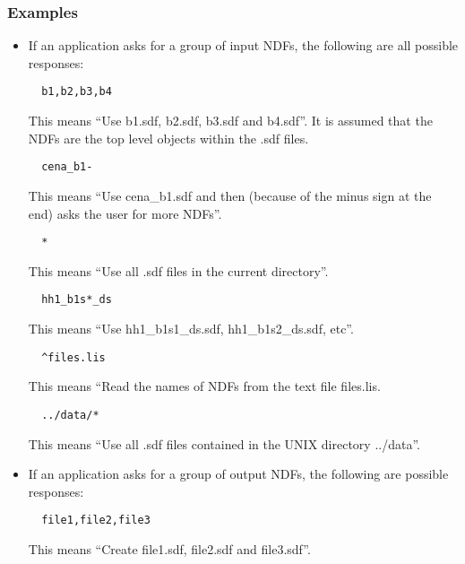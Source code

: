 \subsubsection{Examples}
\begin{itemize}
\item If an application asks for a group of input {\small NDF}s, the following 
are all possible responses:

\small
\begin{verbatim}
  b1,b2,b3,b4
\end{verbatim}
\normalsize
\vspace{-3mm}
This means ``Use b1.sdf, b2.sdf, b3.sdf and b4.sdf''. It is  assumed that the
{\small NDF}s are the top level objects  within the .sdf files.

\small
\begin{verbatim}
  cena_b1-
\end{verbatim}
\normalsize
\vspace{-3mm}
This means ``Use cena\_b1.sdf and then (because of the minus sign at the end)
asks the user for  more {\small NDF}s''.

\small
\begin{verbatim}
  *
\end{verbatim}
\normalsize
\vspace{-3mm}
This means ``Use all .sdf files in the current directory''. 

\small
\begin{verbatim}
  hh1_b1s*_ds
\end{verbatim}
\normalsize
\vspace{-3mm}
This means ``Use hh1\_b1s1\_ds.sdf, hh1\_b1s2\_ds.sdf, etc''.

\small
\begin{verbatim}
  ^files.lis
\end{verbatim}
\normalsize
\vspace{-3mm}
This means ``Read the names of {\small NDF}s from the text file files.lis.

\small
\begin{verbatim}
  ../data/*
\end{verbatim}
\normalsize
\vspace{-3mm}
This means ``Use all .sdf files contained in the {\small UNIX} directory 
../data''.

\item If an application asks for a group of output {\small NDF}s, the following 
are possible responses:

\small
\begin{verbatim}
  file1,file2,file3
\end{verbatim}
\normalsize
\vspace{-3mm}
This means ``Create file1.sdf, file2.sdf and file3.sdf''.


\end{itemize}
